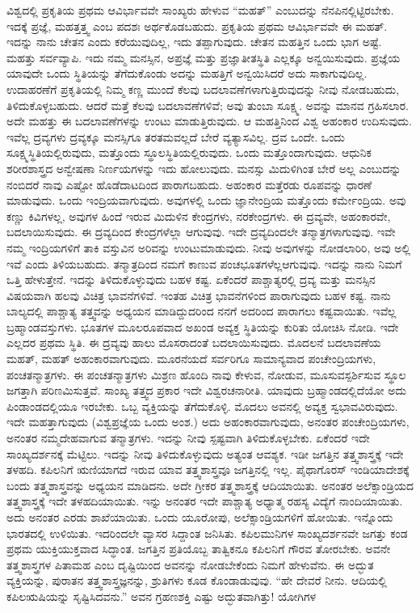 ವಿಶ್ವದಲ್ಲಿ ಪ್ರಕೃತಿಯ ಪ್ರಥಮ ಆವಿರ್ಭಾವವೇ ಸಾಂಖ್ಯರು ಹೇಳುವ “ಮಹತ್'' ಎಂಬುದನ್ನು ನೆನಪಿನಲ್ಲಿಟ್ಟಿರಬೇಕು. ಇದಕ್ಕೆ ಪ್ರಜ್ಞೆ, ಮಹತ್ತತ್ತ್ವ ಎಂಬ ಪದಶಃ ಅರ್ಥಕೊಡಬಹುದು. ಪ್ರಕೃತಿಯ ಪ್ರಥಮ ಆವಿರ್ಭಾವವೇ ಈ ಮಹತ್. ಇದನ್ನು ನಾನು ಚೇತನ ಎಂದು ಕರೆಯುವುದಿಲ್ಲ, ಇದು ತಪ್ಪಾಗುವುದು. ಚೇತನ ಮಹತ್ತಿನ ಒಂದು ಭಾಗ ಅಷ್ಟೆ. ಮಹತ್ತು ಸರ್ವವ್ಯಾಪಿ. ಇದು ನಮ್ಮ ಮನಸ್ಸಿನ, ಅಪ್ರಜ್ಞೆ ಮತ್ತು ಪ್ರಜ್ಞಾತೀತಸ್ಥಿತಿ ಎಲ್ಲಕ್ಕೂ ಅನ್ವಯಿಸುವುದು. ಪ್ರಜ್ಞೆಯ ಯಾವುದೇ ಒಂದು ಸ್ಥಿತಿಯನ್ನು ತೆಗೆದುಕೊಂಡು ಅದನ್ನು ಮಹತ್ತಿಗೆ ಅನ್ವಯಿಸಿದರೆ ಅದು ಸಾಕಾಗುವುದಿಲ್ಲ. ಉದಾಹರಣೆಗೆ ಪ್ರಕೃತಿಯಲ್ಲಿ ನಿಮ್ಮ ಕಣ್ಣ ಮುಂದೆ ಕೆಲವು ಬದಲಾವಣೆಗಳಾಗುತ್ತಿರುವುದನ್ನು ನೀವು ನೋಡಬಹುದು, ತಿಳಿದುಕೊಳ್ಳಬಹುದು. ಆದರೆ ಮತ್ತೆ ಕೆಲವು ಬದಲಾವಣೆಗಳಿವೆ; ಅವು ತುಂಬಾ ಸೂಕ್ಷ್ಮ. ಅವನ್ನು ಮಾನವ ಗ್ರಹಿಸಲಾರ. ಅದೇ ಮಹತ್ತು ಈ ಬದಲಾವಣೆಗಳನ್ನು ಉಂಟು ಮಾಡುತ್ತಿರುವುದು. ಆ ಮಹತ್ತಿನಿಂದ ವಿಶ್ವ ಅಹಂಕಾರ ಉದಿಸುವುದು. ಇವೆಲ್ಲ ದ್ರವ್ಯಗಳು ದ್ರವ್ಯಕ್ಕೂ ಮನಸ್ಸಿಗೂ ತರತಮವಲ್ಲದೆ ಬೇರೆ ವ್ಯತ್ಯಾಸವಿಲ್ಲ. ದ್ರವ ಒಂದೇ. ಒಂದು ಸೂಕ್ಷ್ಮಸ್ಥಿತಿಯಲ್ಲಿರುವುದು, ಮತ್ತೊಂದು ಸ್ಥೂಲಸ್ಥಿತಿಯಲ್ಲಿರುವುದು. ಒಂದು ಮತ್ತೊಂದಾಗುವುದು. ಆಧುನಿಕ ಶರೀರಶಾಸ್ತ್ರದ ಅನ್ವೇಷಣಾ ನಿರ್ಣಯಗಳನ್ನು ಇದು ಹೋಲುವುದು. ಮನಸ್ಸು ಮಿದುಳಿಗಿಂತ ಬೇರೆ ಅಲ್ಲ ಎಂಬುದನ್ನು ನಂಬಿದರೆ ನಾವು ಎಷ್ಟೋ ಹೊಡೆದಾಟದಿಂದ ಪಾರಾಗಬಹುದು. ಅಹಂಕಾರ ಮತ್ತೆರಡು ರೂಪವನ್ನು ಧಾರಣೆ ಮಾಡುವುದು. ಒಂದು ಇಂದ್ರಿಯವಾಗುವುದು. ಅವುಗಳಲ್ಲಿ ಒಂದು ಜ್ಞಾನೇಂದ್ರಿಯ ಮತ್ತೊಂದು ಕರ್ಮೇಂದ್ರಿಯ. ಅವು ಕಣ್ಣು ಕಿವಿಗಳಲ್ಲ, ಅವುಗಳ ಹಿಂದೆ ಇರುವ ಮಿದುಳಿನ ಕೇಂದ್ರಗಳು, ನರಕೇಂದ್ರಗಳು. ಈ ದ್ರವ್ಯವೇ, ಅಹಂಕಾರವೇ, ಬದಲಾಯಿಸುವುದು. ಈ ದ್ರವ್ಯದಿಂದ ಕೇಂದ್ರಗಳೆಲ್ಲಾ ಆಗುವುವು. ಇದೇ ದ್ರವ್ಯದಿಂದಲೇ ತನ್ಮಾತ್ರಗಳಾಗುವುವು. ಇವೇ ನಮ್ಮ ಇಂದ್ರಿಯಗಳಿಗೆ ತಾಕಿ ವಸ್ತುವಿನ ಅರಿವನ್ನು ಉಂಟುಮಾಡುವುದು. ನೀವು ಅವುಗಳನ್ನು ನೋಡಲಾರಿರಿ, ಅವು ಅಲ್ಲಿ ಇವೆ ಎಂದು ತಿಳಿಯಬಹುದು. ತನ್ಮಾತ್ರದಿಂದ ನಮಗೆ ಕಾಣುವ ಪಂಚಭೂತಗಳೆಲ್ಲ\break ಆಗುವುವು. ಇದನ್ನು ನಾನು ನಿಮಗೆ ಒತ್ತಿ ಹೇಳುತ್ತೇನೆ. ಇದನ್ನು ತಿಳಿದುಕೊಳ್ಳುವುದು ಬಹಳ ಕಷ್ಟ. ಏಕೆಂದರೆ ಪಾಶ್ಚಾತ್ಯರಲ್ಲಿ ದ್ರವ್ಯ ಮತ್ತು ಮನಸ್ಸಿನ ವಿಷಯವಾಗಿ ಹಲವು ವಿಚಿತ್ರ ಭಾವನೆಗಳಿವೆ. ಇಂತಹ ವಿಚಿತ್ರ ಭಾವನೆಗಳಿಂದ ಪಾರಾಗುವುದು ಬಹಳ ಕಷ್ಟ. ನಾನು ಬಾಲ್ಯದಲ್ಲಿ ಪಾಶ್ಚಾತ್ಯ ತತ್ತ್ವವನ್ನು ಅಧ್ಯಯನ ಮಾಡಿದ್ದುದರಿಂದ ನನಗೆ ಅದರಿಂದ ಪಾರಾಗಲು ಕಷ್ಟವಾಯಿತು. ಇವೆಲ್ಲ ಬ್ರಹ್ಮಾಂಡವಸ್ತುಗಳು. ಭೂತಗಳ ಮೂಲರೂಪವಾದ ಅಖಂಡ ಅವ್ಯಕ್ತ ಸ್ಥಿತಿಯನ್ನು ಕುರಿತು ಯೋಚಿಸಿ ನೋಡಿ. ಇದೇ ಎಲ್ಲದರ ಪ್ರಥಮ ಸ್ಥಿತಿ. ಈ ದ್ರವ್ಯವು ಹಾಲು ಮೊಸರಾದಂತೆ ಬದಲಾಯಿಸುವುದು. ಮೊದಲನೆ ಬದಲಾವಣೆಯ ಮಹತ್, ಮಹತ್ ಅಹಂಕಾರವಾಗುವುದು. ಮೂರನೆಯದೆ ಸರ್ವರಿಗೂ ಸಾಮಾನ್ಯವಾದ ಪಂಚೇಂದ್ರಿಯಗಳು, ಪಂಚತನ್ಮಾತ್ರಗಳು. ಈ ಪಂಚತನ್ಮಾತ್ರಗಳು ಮಿಶ್ರಣ ಹೊಂದಿ ನಾವು ಕೇಳುವ, ನೋಡುವ, ಮೂಸುವ\break ಸ್ಪರ್ಶಿಸುವ ಸ್ಥೂಲ ಜಗತ್ತಾಗಿ ಪರಿಣಮಿಸುತ್ತವೆ. ಸಾಂಖ್ಯ ತತ್ತ್ವದ ಪ್ರಕಾರ ಇದೇ ವಿಶ್ವರಚನಾರೀತಿ. ಯಾವುದು ಬ್ರಹ್ಮಾಂಡದಲ್ಲಿದೆಯೋ ಅದು ಪಿಂಡಾಂಡದಲ್ಲಿಯೂ ಇರಬೇಕು. ಒಬ್ಬ ವ್ಯಕ್ತಿಯನ್ನು ತೆಗೆದುಕೊಳ್ಳಿ. ಮೊದಲು ಅವನಲ್ಲಿ ಅವ್ಯಕ್ತ ಸ್ವಭಾವವಿರುವುದು. ಇದೇ ಮಹತ್ತಾಗುವುದು (ವಿಶ್ವಪ್ರಜ್ಞೆಯ ಒಂದು ಅಂಶ.) ಅದು ಅಹಂಕಾರವಾಗುವುದು, ಅನಂತರ ಪಂಚೇಂದ್ರಿಯಗಳು, ಅನಂತರ ನಮ್ಮದೇಹವಾಗುವ ತನ್ಮಾತ್ರಗಳು. ಇದನ್ನು ನೀವು ಸ್ಪಷ್ಟವಾಗಿ ತಿಳಿದುಕೊಳ್ಳಬೇಕು. ಏಕೆಂದರೆ ಇದೇ ಸಾಂಖ್ಯದರ್ಶನಕ್ಕೆ ಮೆಟ್ಟಿಲು. ಇದನ್ನು ನೀವು ತಿಳಿದುಕೊಳ್ಳುವುದು ಅತ್ಯಂತ ಆವಶ್ಯಕ. ಇಡೀ ಜಗತ್ತಿನ ತತ್ತ್ವಶಾಸ್ತ್ರಕ್ಕೆ ಇದೇ ತಳಹದಿ. ಕಪಿಲನಿಗೆ ಋಣಿಯಾಗದೆ ಇರುವ ಯಾವ ತತ್ತ್ವಶಾಸ್ತ್ರವೂ ಜಗತ್ತಿನಲ್ಲಿ ಇಲ್ಲ. ಪೈಥಾಗೊರಸ್ ಇಂಡಿಯಾದೇಶಕ್ಕೆ ಬಂದು ತತ್ತ್ವಶಾಸ್ತ್ರವನ್ನು ಅಧ್ಯಯನ ಮಾಡಿದನು. ಅದೇ ಗ್ರೀಕರ ತತ್ತ್ವಶಾಸ್ತ್ರಕ್ಕೆ ಆದಿಯಾಯಿತು. ಅನಂತರ ಅಲೆಕ್ಸಾಂಡ್ರಿಯದ ತತ್ತ್ವಶಾಸ್ತ್ರಕ್ಕೆ ಇದೇ ತಳಹದಿಯಾಯಿತು. ಇನ್ನು ಅನಂತರ ಇದೇ ಪಾಶ್ಚಾತ್ಯ ಅಧ್ಯಾತ್ಮ ರಹಸ್ಯ ವಿದ್ಯೆಗೆ ನಾಂದಿಯಾಯಿತು. ಅದು ಅನಂತರ ಎರಡು ಶಾಖೆಯಾಯಿತು. ಒಂದು ಯೂರೋಪು, ಅಲೆಕ್ಸಾಂಡ್ರಿಯಗಳಿಗೆ ಹೋಯಿತು. ಇನ್ನೊಂದು ಭಾರತದಲ್ಲಿ ಉಳಿಯಿತು. ಇದರಿಂದಲೇ ವ್ಯಾಸರ ಸಿದ್ದಾಂತ ಜನಿಸಿತು. ಕಪಿಲಮುನಿಗಳ ಸಾಂಖ್ಯದರ್ಶನವೇ ಜಗತ್ತು ಕಂಡ ಪ್ರಥಮ ಯುಕ್ತಿಯುಕ್ತವಾದ ಸಿದ್ಧಾಂತ. ಜಗತ್ತಿನ ಪ್ರತಿಯೊಬ್ಬ ತಾತ್ವಿಕನೂ ಕಪಿಲನಿಗೆ ಗೌರವ ತೋರಬೇಕು. ಅವನೇ ತತ್ತ್ವಶಾಸ್ತ್ರಗಳ ಪಿತಾಮಹ ಎಂಬ ದೃಷ್ಟಿಯಿಂದ ಅವನನ್ನು ನೋಡಬೇಕೆಂದು ನಿಮಗೆ ಹೇಳುವೆನು. ಈ ಅದ್ಭುತ ವ್ಯಕ್ತಿಯನ್ನು, ಪುರಾತನ ತತ್ತ್ವಶಾಸ್ತ್ರಜ್ಞನನ್ನು, ಶ್ರುತಿಗಳು ಕೂಡ ಕೊಂಡಾಡುವುವು. “ಹೇ ದೇವರೆ ನೀನು. ಆದಿಯಲ್ಲಿ ಕಪಿಲಋಷಿಯನ್ನು ಸೃಷ್ಟಿಸಿದವನು.'' ಅವನ ಗ್ರಹಣಶಕ್ತಿ ಎಷ್ಟು ಅದ್ಭುತವಾಗಿತ್ತು! ಯೋಗಿಗಳ 